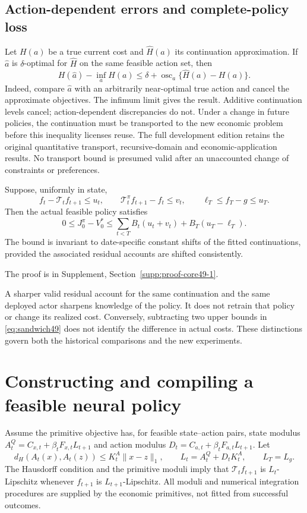 \subsection{Action-dependent errors and complete-policy loss}
Let $H(a)$ be a true current cost and $\widehat H(a)$ its continuation approximation. If $\widehat a$ is $\delta$-optimal for $\widehat H$ on the same feasible action set, then
\begin{equation}\label{eq:center49}
 H(\widehat a)-\inf_aH(a)\le\delta+
 \operatorname{osc}_{a}\{\widehat H(a)-H(a)\}.
\end{equation}
Indeed, compare $\widehat a$ with an arbitrarily near-optimal true action and cancel the approximate objectives. The infimum limit gives the result. Additive continuation levels cancel; action-dependent discrepancies do not. Under a change in future policies, the continuation must be transported to the new economic problem before this inequality licenses reuse. The full development edition retains the original quantitative transport, recursive-domain and economic-application results. No transport bound is presumed valid after an unaccounted change of constraints or preferences.

\begin{proposition}\label{prop:sandwich49}
Suppose, uniformly in state,
\[
 f_t-\mathcal T_tf_{t+1}\le u_t,\qquad
 \mathcal T_t^\pi f_{t+1}-f_t\le v_t,
 \qquad \ell_T\le f_T-g\le u_T.
\]
Then the actual feasible policy satisfies
\begin{equation}\label{eq:sandwich49}
 0\le J_0^\pi-V_0^*\le
 \sum_{t<T}B_t(u_t+v_t)+B_T(u_T-\ell_T).
\end{equation}
The bound is invariant to date-specific constant shifts of the fitted continuations, provided the associated residual accounts are shifted consistently.
\end{proposition}
\noindent The proof is in Supplement, Section~\ref{supp:proof-core49-1}.


A sharper valid residual account for the same continuation and the same deployed actor sharpens knowledge of the policy. It does not retrain that policy or change its realized cost. Conversely, subtracting two upper bounds in \eqref{eq:sandwich49} does not identify the difference in actual costs. These distinctions govern both the historical comparisons and the new experiments.

\section{Constructing and compiling a feasible neural policy}\label{sec:construction49}
Assume the primitive objective has, for feasible state--action pairs, state modulus $A_t^Q=C_{x,t}+\beta_tF_{x,t}L_{t+1}$ and action modulus $D_t=C_{a,t}+\beta_tF_{a,t}L_{t+1}$. Let
\[
 d_H(A_t(x),A_t(z))\le K_t^A\|x-z\|_1,
 \qquad L_t=A_t^Q+D_tK_t^A,\qquad L_T=L_g.
\]
The Hausdorff condition and the primitive moduli imply that $\mathcal T_tf_{t+1}$ is $L_t$-Lipschitz whenever $f_{t+1}$ is $L_{t+1}$-Lipschitz. All moduli and numerical integration procedures are supplied by the economic primitives, not fitted from successful outcomes.

